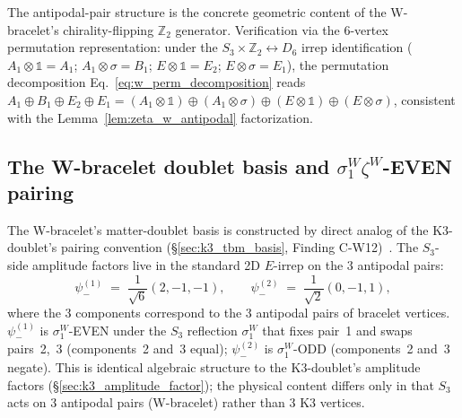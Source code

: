 \documentclass[11pt,letterpaper]{article}
\newcommand{\Dsix}{D_6}
\newcommand{\Sthree}{S_3}
\begin{document}
The antipodal-pair structure is the concrete geometric content of the W-bracelet's chirality-flipping $\mathbb{Z}_2$ generator. Verification via the 6-vertex permutation representation: under the $\Sthree \times \mathbb{Z}_2 \leftrightarrow \Dsix$ irrep identification ($A_1 \otimes \mathbb{1} = A_1$; $A_1 \otimes \sigma = B_1$; $E \otimes \mathbb{1} = E_2$; $E \otimes \sigma = E_1$), the permutation decomposition Eq.~\eqref{eq:w_perm_decomposition} reads $A_1 \oplus B_1 \oplus E_2 \oplus E_1 = (A_1 \otimes \mathbb{1}) \oplus (A_1 \otimes \sigma) \oplus (E \otimes \mathbb{1}) \oplus (E \otimes \sigma)$, consistent with the Lemma~\ref{lem:zeta_w_antipodal} factorization.

\subsection{The W-bracelet doublet basis and $\sigma_1^W \zeta^W$-EVEN pairing}\label{sec:w_doublet_basis}

The W-bracelet's matter-doublet basis is constructed by direct analog of the K3-doublet's pairing convention (\S\ref{sec:k3_tbm_basis}, Finding C-W12)~\cite{abshier_capotauro_subclaim_c_sketch}. The $\Sthree$-side amplitude factors live in the standard 2D $E$-irrep on the 3 antipodal pairs:
\begin{equation}\label{eq:w_amplitude_basis}
\psi_-^{(1)} \;=\; \frac{1}{\sqrt{6}}(2, -1, -1), \qquad \psi_-^{(2)} \;=\; \frac{1}{\sqrt{2}}(0, -1, 1),
\end{equation}
where the 3 components correspond to the 3 antipodal pairs of bracelet vertices. $\psi_-^{(1)}$ is $\sigma_1^W$-EVEN under the $\Sthree$ reflection $\sigma_1^W$ that fixes pair~1 and swaps pairs~2,~3 (components~2 and~3 equal); $\psi_-^{(2)}$ is $\sigma_1^W$-ODD (components~2 and~3 negate). This is identical algebraic structure to the K3-doublet's amplitude factors (\S\ref{sec:k3_amplitude_factor}); the physical content differs only in that $\Sthree$ acts on 3 antipodal pairs (W-bracelet) rather than 3 K3 vertices.
\end{document}
